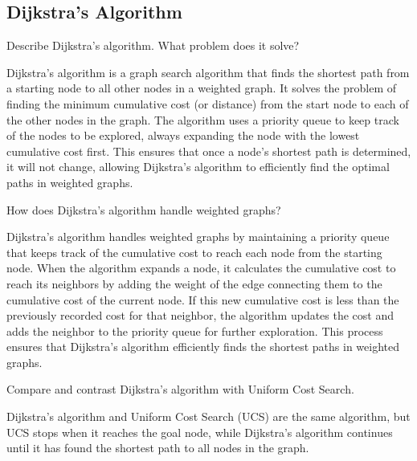 \subsection*{Dijkstra's Algorithm}
\begin{ejercicio}
    Describe Dijkstra's algorithm. What problem does it solve?

    Dijkstra's algorithm is a graph search algorithm that finds the shortest path from a starting node to all other nodes in a weighted graph. It solves the problem of finding the minimum cumulative cost (or distance) from the start node to each of the other nodes in the graph. The algorithm uses a priority queue to keep track of the nodes to be explored, always expanding the node with the lowest cumulative cost first. This ensures that once a node's shortest path is determined, it will not change, allowing Dijkstra's algorithm to efficiently find the optimal paths in weighted graphs.
\end{ejercicio}
\begin{ejercicio}
    How does Dijkstra's algorithm handle weighted graphs?

    Dijkstra's algorithm handles weighted graphs by maintaining a priority queue that keeps track of the cumulative cost to reach each node from the starting node. When the algorithm expands a node, it calculates the cumulative cost to reach its neighbors by adding the weight of the edge connecting them to the cumulative cost of the current node. If this new cumulative cost is less than the previously recorded cost for that neighbor, the algorithm updates the cost and adds the neighbor to the priority queue for further exploration. This process ensures that Dijkstra's algorithm efficiently finds the shortest paths in weighted graphs.
\end{ejercicio} 
\begin{ejercicio}
    Compare and contrast Dijkstra's algorithm with Uniform Cost Search.

    Dijkstra's algorithm and Uniform Cost Search (UCS) are the same algorithm, but UCS stops when it reaches the goal node, while Dijkstra's algorithm continues until it has found the shortest path to all nodes in the graph.
\end{ejercicio}



